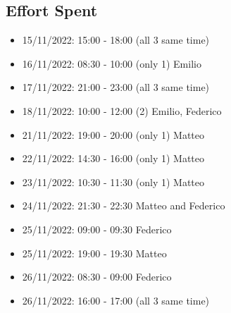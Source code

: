 \subsection{Effort Spent}
\begin{itemize}
    \item 15/11/2022: 15:00 - 18:00 (all 3 same time)
    \item 16/11/2022: 08:30 - 10:00 (only 1) Emilio
    \item 17/11/2022: 21:00 - 23:00 (all 3 same time)
    \item 18/11/2022: 10:00 - 12:00 (2) Emilio, Federico
    \item 21/11/2022: 19:00 - 20:00 (only 1) Matteo
    \item 22/11/2022: 14:30 - 16:00 (only 1) Matteo
    \item 23/11/2022: 10:30 - 11:30 (only 1) Matteo
    \item 24/11/2022: 21:30 - 22:30 Matteo and Federico
    \item 25/11/2022: 09:00 - 09:30 Federico
    \item 25/11/2022: 19:00 - 19:30 Matteo
    \item 26/11/2022: 08:30 - 09:00 Federico
    \item 26/11/2022: 16:00 - 17:00 (all 3 same time)
\end{itemize}